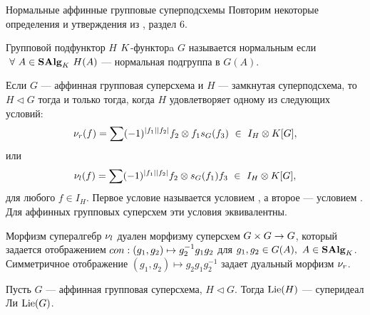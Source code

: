 \begin{subsection}{Нормальные аффинные групповые суперподсхемы}
  Повторим некоторые определения и утверждения из \cite{affine_quotients}, раздел 6.
  \newline

  \begin{definition}
    Групповой подфунктор $ H $ $K$-функторa $ G $ называется нормальным
    если $ ~\forall ~A \in \mathbf{SAlg}_K ~H(A) $ --- нормальная подгруппа в $ G(A) $.
  \end{definition}

  Если $ G $ --- аффинная групповая суперсхема и $ H $ ---
  замкнутая суперподсхема, то $ H \lhd G $ тогда и только тогда, когда
  $ H $ удовлетворяет одному из следующих условий:
  \begin{align*}
    \mnu_r(f) = \sum \sgn{f_1}{f_2} f_2 \o f_1 \mci_G(f_3) ~\in ~I_H \o \K[G],
  \end{align*}
  или
  \begin{align*}
    \mnu_l(f) = \sum \sgn{f_1}{f_2} f_2 \o \mci_G(f_1) f_3 ~\in ~I_H \o \K[G],
  \end{align*}
  для любого $ f \in I_H $. Первое условие называется условием
  , а второе --- условием .
  Для аффинных групповых суперсхем эти условия эквивалентны.

  Морфизм супералгебр $ \nu_l $ дуален морфизму суперсхем $ G \times G \to G $,
  который задается отображением $ con: (g_1, g_2) \mapsto g_2^{-1} g_1 g_2 $ для
  $ g_1, g_2 \in G(A), ~A \in \mathbf{SAlg}_K $. Симметричное отображение
  $ (g_1, g_2) \mapsto g_2 g_1 g_2^{-1} $ задает дуальный морфизм $ \nu_r $.

  \begin{lemma}
    Пусть $ G $ --- аффинная групповая суперсхема, $ H \lhd G $. Тогда
    $ \mathrm{Lie}(H) $ --- суперидеал Ли $ \mathrm{Lie}(G) $.
  \end{lemma}


\end{subsection}

